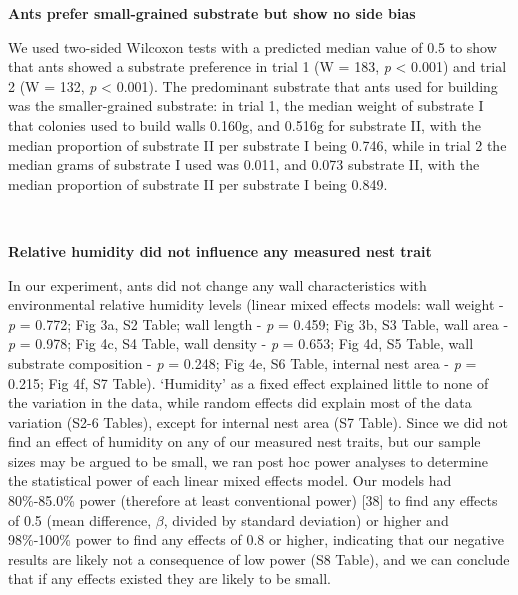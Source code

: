\documentclass[3p]{elsarticle} %
\begin{document}
\textbf{Ants prefer small-grained substrate but show no side bias}

We used two-sided Wilcoxon tests with a predicted median value of 0.5 to
show that ants showed a substrate preference in trial 1 (W = 183,
\emph{p} \textless{} 0.001) and trial 2 (W = 132, \emph{p} \textless{}
0.001). The predominant substrate that ants used for building was the
smaller-grained substrate: in trial 1, the median weight of substrate I
that colonies used to build walls 0.160g, and 0.516g for substrate II,
with the median proportion of substrate II per substrate I being 0.746,
while in trial 2 the median grams of substrate I used was 0.011, and
0.073 substrate II, with the median proportion of substrate II per
substrate I being 0.849.

~

\textbf{Relative humidity did not influence any measured nest trait}

In our experiment, ants did not change any wall characteristics with
environmental relative humidity levels (linear mixed effects models:
wall weight - \emph{p} = 0.772; Fig 3a, S2 Table; wall length - \emph{p}
= 0.459; Fig 3b, S3 Table, wall area - \emph{p} = 0.978; Fig 4c, S4
Table, wall density - \emph{p} = 0.653; Fig 4d, S5 Table, wall substrate
composition - \emph{p} = 0.248; Fig 4e, S6 Table, internal nest area -
\emph{p} = 0.215; Fig 4f, S7 Table). `Humidity' as a fixed effect
explained little to none of the variation in the data, while random
effects did explain most of the data variation (S2-6 Tables), except for
internal nest area (S7 Table). Since we did not find an effect of
humidity on any of our measured nest traits, but our sample sizes may be
argued to be small, we ran post hoc power analyses to determine the
statistical power of each linear mixed effects model. Our models had
80\%-85.0\% power (therefore at least conventional power) {[}38{]} to
find any effects of 0.5 (mean difference, \(\beta\), divided by standard
deviation) or higher and 98\%-100\% power to find any effects of 0.8 or
higher, indicating that our negative results are likely not a
consequence of low power (S8 Table), and we can conclude that if any
effects existed they are likely to be small.
\end{document}
